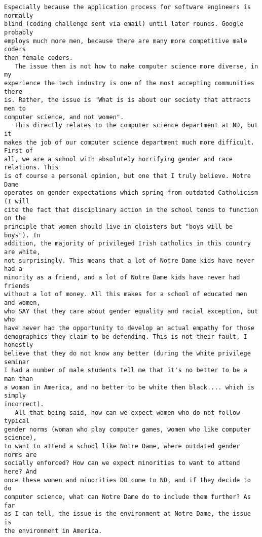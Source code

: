 \documentclass{article}
\begin{document}
\begin{verbatim}
Especially because the application process for software engineers is normally
blind (coding challenge sent via email) until later rounds. Google probably
employs much more men, because there are many more competitive male coders
then female coders.
   The issue then is not how to make computer science more diverse, in my 
experience the tech industry is one of the most accepting communities there
is. Rather, the issue is "What is is about our society that attracts men to 
computer science, and not women".
   This directly relates to the computer science department at ND, but it 
makes the job of our computer science department much more difficult. First of
all, we are a school with absolutely horrifying gender and race relations. This
is of course a personal opinion, but one that I truly believe. Notre Dame 
operates on gender expectations which spring from outdated Catholicism (I will
cite the fact that disciplinary action in the school tends to function on the
principle that women should live in cloisters but "boys will be boys"). In 
addition, the majority of privileged Irish catholics in this country are white,
not surprisingly. This means that a lot of Notre Dame kids have never had a
minority as a friend, and a lot of Notre Dame kids have never had friends 
without a lot of money. All this makes for a school of educated men and women,
who SAY that they care about gender equality and racial exception, but who 
have never had the opportunity to develop an actual empathy for those 
demographics they claim to be defending. This is not their fault, I honestly
believe that they do not know any better (during the white privilege seminar 
I had a number of male students tell me that it's no better to be a man than 
a woman in America, and no better to be white then black.... which is simply
incorrect).
   All that being said, how can we expect women who do not follow typical 
gender norms (woman who play computer games, women who like computer science), 
to want to attend a school like Notre Dame, where outdated gender norms are 
socially enforced? How can we expect minorities to want to attend here? And 
once these women and minorities DO come to ND, and if they decide to do 
computer science, what can Notre Dame do to include them further? As far
as I can tell, the issue is the environment at Notre Dame, the issue is 
the environment in America. 
	\end{verbatim}
\end{document}
